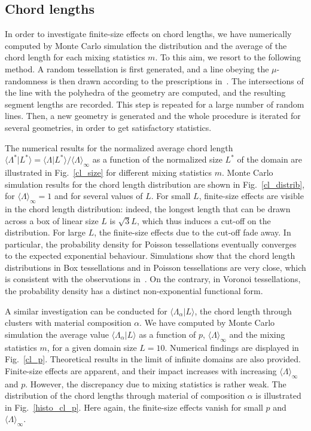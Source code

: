 \documentclass[final,authoryear,5p,times,twocolumn]{elsarticle}
\begin{document}
\subsection{Chord lengths}

In order to investigate finite-size effects on chord lengths, we have numerically computed by Monte Carlo simulation the distribution and the average of the chord length for each mixing statistics $m$. To this aim, we resort to the following method. A random tessellation is first generated, and a line obeying the $\mu$-randomness is then drawn according to the prescriptions in~\cite{coleman}. The intersections of the line with the polyhedra of the geometry are computed, and the resulting segment lengths are recorded. This step is repeated for a large number of random lines. Then, a new geometry is generated and the whole procedure is iterated for several geometries, in order to get satisfactory statistics.

The numerical results for the normalized average chord length ${\langle \Lambda^* | L^* \rangle}={\langle \Lambda | L^* \rangle} / {\langle \Lambda \rangle}_{\infty}$ as a function of the normalized size $L^*$ of the domain are illustrated in Fig.~\ref{cl_size} for different mixing statistics $m$. Monte Carlo simulation results for the chord length distribution are shown in Fig.~\ref{cl_distrib}, for ${\langle \Lambda \rangle}_{\infty}=1$ and for several values of $L$. For small $L$, finite-size effects are visible in the chord length distribution: indeed, the longest length that can be drawn across a box of linear size $L$ is $\sqrt{3}L$, which thus induces a cut-off on the distribution. For large $L$, the finite-size effects due to the cut-off fade away. In particular, the probability density for Poisson tessellations eventually converges to the expected exponential behaviour. Simulations show that the chord length distributions in Box tessellations and in Poisson tessellations are very close, which is consistent with the observations in~\cite{mikhailov}. On the contrary, in Voronoi tessellations, the probability density has a distinct non-exponential functional form.

A similar investigation can be conducted for $\langle \Lambda_{\alpha} | L \rangle$, the chord length through clusters with material composition $\alpha$. We have computed by Monte Carlo simulation the average value $\langle \Lambda_{\alpha} | L \rangle$ as a function of $p$, ${\langle \Lambda \rangle}_{\infty}$ and the mixing statistics $m$, for a given domain size $L=10$. Numerical findings are displayed in Fig.~\ref{cl_p}. Theoretical results in the limit of infinite domains are also provided. Finite-size effects are apparent, and their impact increases with increasing ${\langle \Lambda \rangle}_{\infty}$ and $p$. However, the discrepancy due to mixing statistics is rather weak. The distribution of the chord lengths through material of composition $\alpha$ is illustrated in Fig.~\ref{histo_cl_p}. Here again, the finite-size effects vanish for small $p$ and ${\langle \Lambda \rangle}_{\infty}$.
\end{document}
